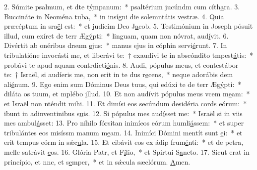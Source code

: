 2. Súmite psalmum, et dte t\uline{ý}mpanum:~* psaltérium jucúndm cum cíth\uline{a}ra.
3. Buccináte in Neoména t\uline{u}ba,~* in insígni die solemntátis v\uline{e}stræ.
4. Quia præcéptum in sra\uline{ë}l est:~* et judícim Deo J\uline{a}cob.
5. Testimónium in Joseph pósuit illud, cum exíret de terr Æg\uline{ý}pti:~* linguam, quam non nóvrat, aud\uline{í}vit.
6. Divértit ab onéribus drsum \uline{e}jus:~* manus ejus in cóphin servi\uline{é}runt.
7. In tribulatióne invocásti me, et liberávi te:~† exaudívi te in abscóndito tmpest\uline{á}tis:~* probávi te apud aquam contrdicti\uline{ó}nis.
8. Audi, pópulus meus, et contestábor te:~† Israël, si audíeris me, non erit in te dus r\uline{e}cens,~* neque adorábis dem ali\uline{é}num.
9. Ego enim sum Dóminus Deus tuus, qui edúxi te de terr Æg\uline{ý}pti:~* diláta os tuum, et mplébo \uline{i}llud.
10. Et non audívit pópulus meus vcem m\uline{e}am:~* et Israël non nténdit m\uline{i}hi.
11. Et dimísi eos secúndum desidéria cords e\uline{ó}rum:~* ibunt in adinventinibus s\uline{u}is.
12. Si pópulus mes aud\uline{í}sset me:~* Israël si in viis mes ambul\uline{á}sset:
13. Pro níhilo fórsitan inimícos eórum humli\uline{á}ssem:~* et super tribulántes eos misíssm manum m\uline{e}am.
14. Inimíci Dómini mentít sunt \uline{e}i:~* et erit tempus eórm in sǽc\uline{u}la.
15. Et cibávit eos ex ádip frum\uline{é}nti:~* et de petra, melle satrávit \uline{e}os.
16. Glória Patr, et F\uline{í}lio,~* et Spirtui S\uline{a}ncto.
17. Sicut erat in princípio, et nnc, et s\uline{e}mper,~* et in sǽcula sæclórum. \uline{A}men.
